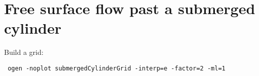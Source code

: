\section{Free surface flow past a submerged cylinder}\label{sec:submergedCylinder}


Build a grid:

\begin{lstlisting}
 ogen -noplot submergedCylinderGrid -interp=e -factor=2 -ml=1
\end{lstlisting}
